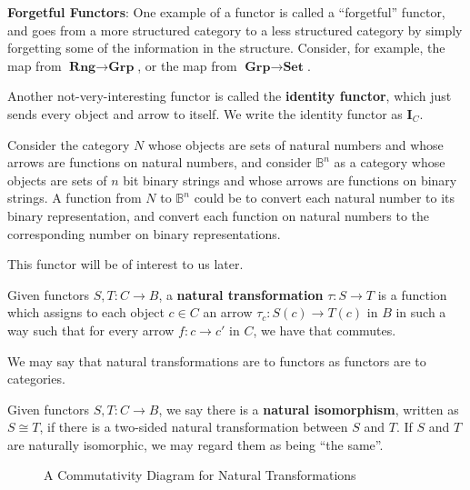 \documentclass[14pt]{extarticle}  %
\begin{document}
\begin{ex} \textbf{Forgetful Functors}: One example of a functor is called a ``forgetful'' functor, and goes from a more structured category to a less structured
  category by simply forgetting some of the information in the structure. Consider, for example, the map from $\textbf{Rng} \to \textbf{Grp}$, or the map from $\textbf{Grp}\to\textbf{Set}$.

  Another not-very-interesting functor is called the \textbf{identity functor}, which just sends every object and arrow to itself. We write the identity functor as $\textbf{I}_{C}$.
\end{ex}

\begin{ex}
  Consider the category $N$ whose objects are sets of natural numbers and whose arrows are functions on natural numbers, and consider $\mathbb{B}^{n}$ as a category whose objects
  are sets of $n$ bit binary strings and whose arrows are functions on binary strings. A function from $N$ to $\mathbb{B}^{n}$ could be to convert each natural number to its binary representation,
  and convert each function on natural numbers to the corresponding number on binary representations.

  This functor will be of interest to us later.
\end{ex}

\begin{defn}
  Given functors $S,T : C \to B$, a \textbf{natural transformation} $\tau : S \to T$ is a function which assigns to each object $c \in C$ an arrow $\tau_{c} : S(c) \to T(c)$ in $B$ in such a way such that
  for every arrow $f : c \to c'$ in $C$, we have that  commutes.
\end{defn}
We may say that natural transformations are to functors as functors are to categories.

\begin{defn}
  Given functors $S,T : C \to B$, we say there is a \textbf{natural isomorphism}, written as $S \cong T$, if there is a two-sided natural transformation between $S$ and $T$.
  If $S$ and $T$ are naturally isomorphic, we may regard them as being ``the same''.
\end{defn}
\begin{figure}
\centering
\caption{A Commutativity Diagram for Natural Transformations}
\label{fig:nattrans}
\end{figure}
\end{document}
